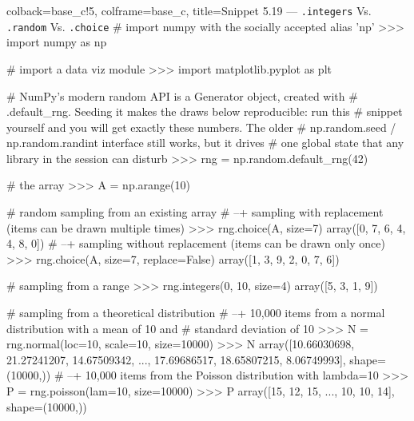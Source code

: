 \documentclass[a4paper,11pt]{book}
\begin{document}
\begin{pythoncode}[linenos=true,]{colback=base_c!5, colframe=base_c, title=\sffamily Snippet 5.19 --- \texttt{.integers} Vs. \texttt{.random} Vs. \texttt{.choice}}
# import numpy with the socially accepted alias 'np'
>>> import numpy as np

# import a data viz module
>>> import matplotlib.pyplot as plt

# NumPy's modern random API is a Generator object, created with
# .default_rng. Seeding it makes the draws below reproducible: run this
# snippet yourself and you will get exactly these numbers. The older
# np.random.seed / np.random.randint interface still works, but it drives
# one global state that any library in the session can disturb
>>> rng = np.random.default_rng(42)

# the array
>>> A = np.arange(10)

# random sampling from an existing array
# --+ sampling with replacement (items can be drawn multiple times)
>>> rng.choice(A, size=7)
array([0, 7, 6, 4, 4, 8, 0])
# --+ sampling without replacement (items can be drawn only once)
>>> rng.choice(A, size=7, replace=False)
array([1, 3, 9, 2, 0, 7, 6])

# sampling from a range
>>> rng.integers(0, 10, size=4)
array([5, 3, 1, 9])

# sampling from a theoretical distribution
# --+ 10,000 items from a normal distribution with a mean of 10 and
# standard deviation of 10
>>> N = rng.normal(loc=10, scale=10, size=10000)
>>> N
array([10.66030698, 21.27241207, 14.67509342, ..., 17.69686517,
       18.65807215,  8.06749993], shape=(10000,))
# --+ 10,000 items from the Poisson distribution with lambda=10
>>> P = rng.poisson(lam=10, size=10000)
>>> P
array([15, 12, 15, ..., 10, 10, 14], shape=(10000,))


\end{pythoncode}
\end{document}
